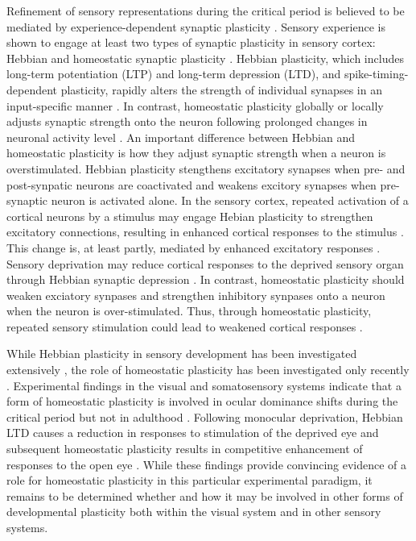 Refinement of sensory representations during the critical period is believed to be mediated by experience-dependent synaptic plasticity \cite{Dan2006, Feldman2009}. Sensory experience is shown to engage at least two types of synaptic plasticity in sensory cortex: Hebbian and homeostatic synaptic plasticity \cite{Desai2002, Fu2002, Heynen2003, Crozier2007, Goel2007, Maffei2008}. Hebbian plasticity, which includes long-term potentiation (LTP) and long-term depression (LTD), and spike-timing­-dependent plasticity, rapidly alters the strength of individual synapses in an input-specific manner \cite{Zhang1998, Abbott2000, Malenka2004, Dan2006}. In contrast, homeostatic plasticity globally or locally adjusts synaptic strength onto the neuron following prolonged changes in neuronal activity level \cite{Davis2001, Burrone2003, Turrigiano2004, Hou2008}. An important difference between Hebbian and homeostatic plasticity is how they adjust synaptic strength when a neuron is overstimulated. Hebbian plasticity stengthens excitatory synapses when pre- and post-synpatic neurons are coactivated and weakens excitory synapses when pre-synaptic neuron is activated alone. In the sensory cortex, repeated activation of a cortical neurons by a stimulus may engage Hebian plasticity to strengthen excitatory connections, resulting in enhanced cortical responses to the stimulus \cite{Zhang2001}. This change is, at least partly, mediated by enhanced excitatory responses \cite{Froemke2007, Sun2010}. Sensory deprivation may reduce cortical responses to the deprived sensory organ through Hebbian synaptic depression \cite{Heynen2003}. In contrast, homeostatic plasticity should weaken exciatory synpases and strengthen inhibitory synpases onto a neuron when the neuron is over-stimulated. Thus, through homeostatic plasticity, repeated sensory stimulation could lead to weakened cortical responses \cite{Condon1991, Pienkowski2012}.

While Hebbian plasticity in sensory development has been investigated extensively \cite{Feldman2009}, the role of homeostatic plasticity has been investigated only recently \cite{Mrsic-Flogel2007}. Experimental findings in the visual and somatosensory systems indicate that a form of homeostatic plasticity is involved in ocular dominance shifts during the critical period but not in adulthood \cite{Kaneko2008, Ranson2012}. Following monocular deprivation, Hebbian LTD causes a reduction in responses to stimulation of the deprived eye and subsequent homeostatic plasticity results in competitive enhancement of responses to the open eye \cite{Frenkel2004, Kaneko2008, Ranson2012}. While these findings provide convincing evidence of a role for homeostatic plasticity in this particular experimental paradigm, it remains to be determined whether and how it may be involved in other forms of developmental plasticity both within the visual system and in other sensory systems.

